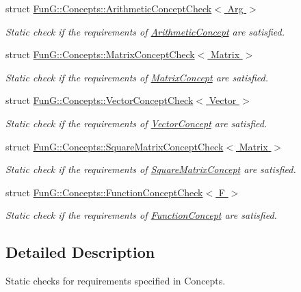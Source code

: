 \begin{DoxyCompactItemize}
struct \hyperlink{structFunG_1_1Concepts_1_1ArithmeticConceptCheck}{Fun\-G\-::\-Concepts\-::\-Arithmetic\-Concept\-Check$<$ Arg $>$}
\begin{DoxyCompactList}\small\item\em Static check if the requirements of \hyperlink{structFunG_1_1Concepts_1_1ArithmeticConcept}{Arithmetic\-Concept} are satisfied. \end{DoxyCompactList}\item 
struct \hyperlink{structFunG_1_1Concepts_1_1MatrixConceptCheck}{Fun\-G\-::\-Concepts\-::\-Matrix\-Concept\-Check$<$ Matrix $>$}
\begin{DoxyCompactList}\small\item\em Static check if the requirements of \hyperlink{structFunG_1_1Concepts_1_1MatrixConcept}{Matrix\-Concept} are satisfied. \end{DoxyCompactList}\item 
struct \hyperlink{structFunG_1_1Concepts_1_1VectorConceptCheck}{Fun\-G\-::\-Concepts\-::\-Vector\-Concept\-Check$<$ Vector $>$}
\begin{DoxyCompactList}\small\item\em Static check if the requirements of \hyperlink{structFunG_1_1Concepts_1_1VectorConcept}{Vector\-Concept} are satisfied. \end{DoxyCompactList}\item 
struct \hyperlink{structFunG_1_1Concepts_1_1SquareMatrixConceptCheck}{Fun\-G\-::\-Concepts\-::\-Square\-Matrix\-Concept\-Check$<$ Matrix $>$}
\begin{DoxyCompactList}\small\item\em Static check if the requirements of \hyperlink{structFunG_1_1Concepts_1_1SquareMatrixConcept}{Square\-Matrix\-Concept} are satisfied. \end{DoxyCompactList}\item 
struct \hyperlink{structFunG_1_1Concepts_1_1FunctionConceptCheck}{Fun\-G\-::\-Concepts\-::\-Function\-Concept\-Check$<$ F $>$}
\begin{DoxyCompactList}\small\item\em Static check if the requirements of \hyperlink{structFunG_1_1Concepts_1_1FunctionConcept}{Function\-Concept} are satisfied. \end{DoxyCompactList}\end{DoxyCompactItemize}


\subsection{Detailed Description}
Static checks for requirements specified in Concepts. 